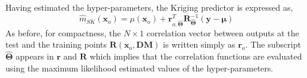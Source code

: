 

Having estimated the hyper-parameters, the Kriging predictor is expressed as,
\begin{equation}
	\hat{m}_{SK}(\mathbf{x}_o) =  \mu(\mathbf{x}_o) + \mathbf{r}^T_{o,\hat{\boldsymbol{\Theta}}} \mathbf{R}^{-1}_{\hat{\boldsymbol{\Theta}}} (\mathbf{y} - \boldsymbol{\mu})
\label{eq:sk_predictor_ml}
\end{equation}
As before, for compactness, the $N \times 1$ correlation vector between outputs at the test and the training points $\mathbf{R}(\mathbf{x}_o, \mathbf{DM})$ is written simply as $\mathbf{r}_o$.
The subscript $\hat{\boldsymbol{\Theta}}$ appears in $\mathbf{r}$ and $\mathbf{R}$ which implies that the correlation functions are evaluated using the maximum likelihood estimated values of the hyper-parameters.

